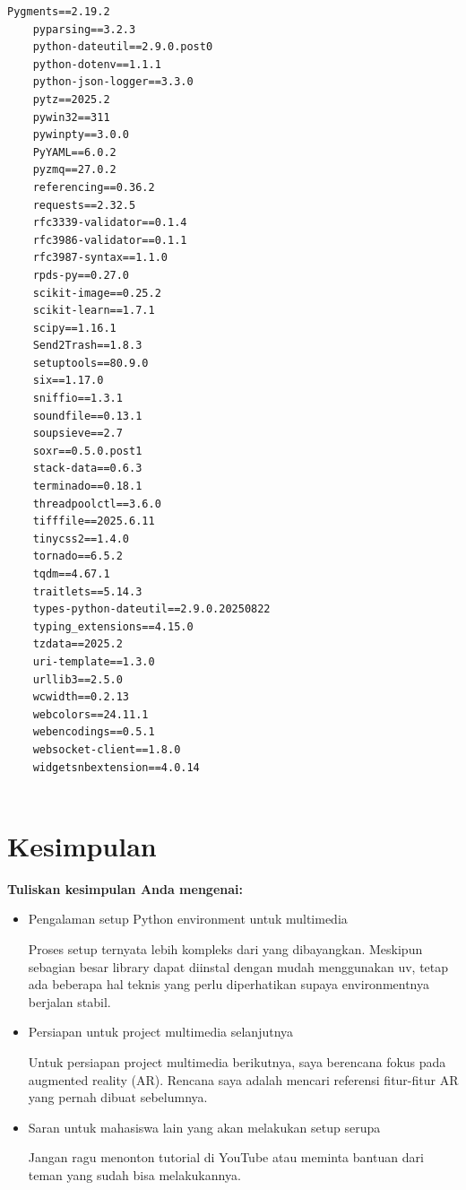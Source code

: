 \documentclass[11pt,a4paper]{article}
\begin{document}
\begin{lstlisting}[caption=Environment/Requirements file]
    Pygments==2.19.2
    pyparsing==3.2.3
    python-dateutil==2.9.0.post0
    python-dotenv==1.1.1
    python-json-logger==3.3.0
    pytz==2025.2
    pywin32==311
    pywinpty==3.0.0
    PyYAML==6.0.2
    pyzmq==27.0.2
    referencing==0.36.2
    requests==2.32.5
    rfc3339-validator==0.1.4
    rfc3986-validator==0.1.1
    rfc3987-syntax==1.1.0
    rpds-py==0.27.0
    scikit-image==0.25.2
    scikit-learn==1.7.1
    scipy==1.16.1
    Send2Trash==1.8.3
    setuptools==80.9.0
    six==1.17.0
    sniffio==1.3.1
    soundfile==0.13.1
    soupsieve==2.7
    soxr==0.5.0.post1
    stack-data==0.6.3
    terminado==0.18.1
    threadpoolctl==3.6.0
    tifffile==2025.6.11
    tinycss2==1.4.0
    tornado==6.5.2
    tqdm==4.67.1
    traitlets==5.14.3
    types-python-dateutil==2.9.0.20250822
    typing_extensions==4.15.0
    tzdata==2025.2
    uri-template==1.3.0
    urllib3==2.5.0
    wcwidth==0.2.13
    webcolors==24.11.1
    webencodings==0.5.1
    websocket-client==1.8.0
    widgetsnbextension==4.0.14
    
\end{lstlisting}

\section{Kesimpulan}
\textbf{Tuliskan kesimpulan Anda mengenai:}
\begin{itemize}
    \item Pengalaman setup Python environment untuk multimedia \\
    \begin{itshape}
        Proses setup ternyata lebih kompleks dari yang dibayangkan. Meskipun sebagian besar library dapat diinstal dengan mudah menggunakan uv, tetap ada beberapa hal teknis yang perlu diperhatikan supaya environmentnya berjalan stabil.
    \end{itshape}
    \item Persiapan untuk project multimedia selanjutnya \\
    \begin{itshape}
        Untuk persiapan project multimedia berikutnya, saya berencana fokus pada augmented reality (AR). Rencana saya adalah mencari referensi fitur-fitur AR yang pernah dibuat sebelumnya.
    \end{itshape}
    \item Saran untuk mahasiswa lain yang akan melakukan setup serupa \\
    \begin{itshape}
        Jangan ragu menonton tutorial di YouTube atau meminta bantuan dari teman yang sudah bisa melakukannya.
    \end{itshape}
\end{itemize}
\end{document}

